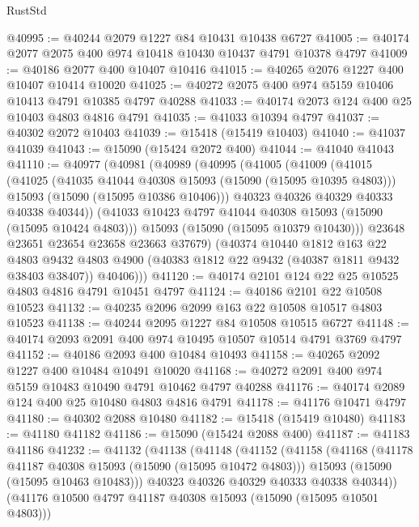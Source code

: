 \begin{lexlean}{RustStd}
\begin{coremodule}
@40995 := @40244 @2079 @1227 @84 @10431 @10438 @6727
@41005 := @40174 @2077 @2075 @400 @974 @10418 @10430 @10437 @4791 @10378 @4797
@41009 := @40186 @2077 @400 @10407 @10416
@41015 := @40265 @2076 @1227 @400 @10407 @10414 @10020
@41025 := @40272 @2075 @400 @974 @5159 @10406 @10413 @4791 @10385 @4797 @40288
@41033 := @40174 @2073 @124 @400 @25 @10403 @4803 @4816 @4791
@41035 := @41033 @10394 @4797
@41037 := @40302 @2072 @10403
@41039 := @15418 (@15419 @10403)
@41040 := @41037 @41039
@41043 := @15090 (@15424 @2072 @400)
@41044 := @41040 @41043
@41110 := @40977
    (@40981
      (@40989
        (@40995
          (@41005
            (@41009
              (@41015
                (@41025
                  (@41035 @41044 @40308 @15093 (@15090 (@15095 @10395 @4803)))
                  @15093
                  (@15090 (@15095 @10386 @10406)))
                @40323
                @40326
                @40329
                @40333
                @40338
                @40344))
            (@41033 @10423 @4797 @41044 @40308 @15093 (@15090 (@15095 @10424 @4803)))
            @15093
            (@15090 (@15095 @10379 @10430)))
          @23648
          @23651
          @23654
          @23658
          @23663
          @37679)
        (@40374
          @10440
          @1812
          @163
          @22
          @4803
          @9432
          @4803
          @4900
          (@40383 @1812 @22 @9432 (@40387 @1811 @9432 @38403 @38407))
          @40406)))
@41120 := @40174 @2101 @124 @22 @25 @10525 @4803 @4816 @4791 @10451 @4797
@41124 := @40186 @2101 @22 @10508 @10523
@41132 := @40235 @2096 @2099 @163 @22 @10508 @10517 @4803 @10523
@41138 := @40244 @2095 @1227 @84 @10508 @10515 @6727
@41148 := @40174 @2093 @2091 @400 @974 @10495 @10507 @10514 @4791 @3769 @4797
@41152 := @40186 @2093 @400 @10484 @10493
@41158 := @40265 @2092 @1227 @400 @10484 @10491 @10020
@41168 := @40272 @2091 @400 @974 @5159 @10483 @10490 @4791 @10462 @4797 @40288
@41176 := @40174 @2089 @124 @400 @25 @10480 @4803 @4816 @4791
@41178 := @41176 @10471 @4797
@41180 := @40302 @2088 @10480
@41182 := @15418 (@15419 @10480)
@41183 := @41180 @41182
@41186 := @15090 (@15424 @2088 @400)
@41187 := @41183 @41186
@41232 := @41132
    (@41138
      (@41148
        (@41152
          (@41158
            (@41168
              (@41178 @41187 @40308 @15093 (@15090 (@15095 @10472 @4803)))
              @15093
              (@15090 (@15095 @10463 @10483)))
            @40323
            @40326
            @40329
            @40333
            @40338
            @40344))
        (@41176 @10500 @4797 @41187 @40308 @15093 (@15090 (@15095 @10501 @4803)))

\end{coremodule}
\end{lexlean}
